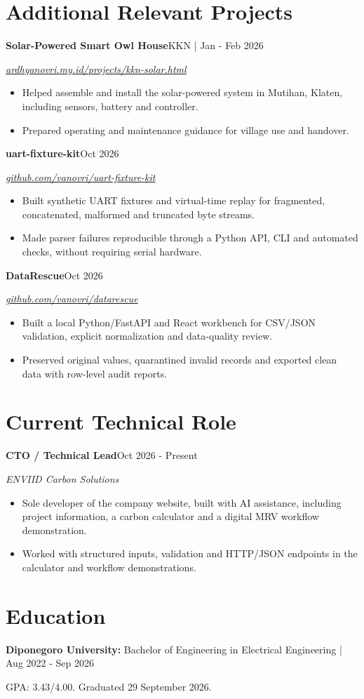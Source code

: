 \documentclass[11pt,a4paper]{article}
\newcommand{\entry}[3]{\Needspace{4\baselineskip}\textbf{#1}\hfill #2\par\textit{#3}\par}
\begin{document}
\section{Additional Relevant Projects}
\entry{Solar-Powered Smart Owl House}{KKN | Jan - Feb 2026}{\href{https://ardhyanovri.my.id/projects/kkn-solar.html}{ardhyanovri.my.id/projects/kkn-solar.html}}
\begin{itemize}
\item Helped assemble and install the solar-powered system in Mutihan, Klaten, including sensors, battery and controller.
\item Prepared operating and maintenance guidance for village use and handover.
\end{itemize}
\entry{uart-fixture-kit}{Oct 2026}{\href{https://github.com/vanovri/uart-fixture-kit}{github.com/vanovri/uart-fixture-kit}}
\begin{itemize}
\item Built synthetic UART fixtures and virtual-time replay for fragmented, concatenated, malformed and truncated byte streams.
\item Made parser failures reproducible through a Python API, CLI and automated checks, without requiring serial hardware.
\end{itemize}
\entry{DataRescue}{Oct 2026}{\href{https://github.com/vanovri/datarescue}{github.com/vanovri/datarescue}}
\begin{itemize}
\item Built a local Python/FastAPI and React workbench for CSV/JSON validation, explicit normalization and data-quality review.
\item Preserved original values, quarantined invalid records and exported clean data with row-level audit reports.
\end{itemize}
\section{Current Technical Role}
\entry{CTO / Technical Lead}{Oct 2026 - Present}{ENVIID Carbon Solutions}
\begin{itemize}
\item Sole developer of the company website, built with AI assistance, including project information, a carbon calculator and a digital MRV workflow demonstration.
\item Worked with structured inputs, validation and HTTP/JSON endpoints in the calculator and workflow demonstrations.
\end{itemize}
\section{Education}
\textbf{Diponegoro University:} Bachelor of Engineering in Electrical Engineering | Aug 2022 - Sep 2026\par
GPA: 3.43/4.00. Graduated 29 September 2026.
\end{document}
